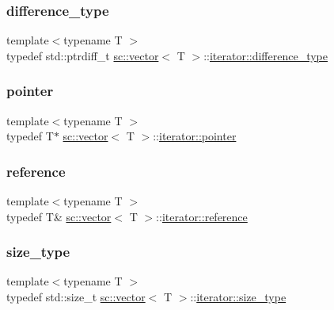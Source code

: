 \subsubsection{\texorpdfstring{difference\+\_\+type}{difference\_type}}
{\footnotesize\ttfamily template$<$typename T $>$ \\
typedef std\+::ptrdiff\+\_\+t \hyperlink{classsc_1_1vector}{sc\+::vector}$<$ T $>$\+::\hyperlink{classsc_1_1vector_1_1iterator_a7089358e9f654206713ecd3951ac3545}{iterator\+::difference\+\_\+type}}

\mbox{\label{classsc_1_1vector_1_1iterator_a518f02aadbb3fd937bdbda24120d2678}} 
\subsubsection{\texorpdfstring{pointer}{pointer}}
{\footnotesize\ttfamily template$<$typename T $>$ \\
typedef T$\ast$ \hyperlink{classsc_1_1vector}{sc\+::vector}$<$ T $>$\+::\hyperlink{classsc_1_1vector_1_1iterator_a518f02aadbb3fd937bdbda24120d2678}{iterator\+::pointer}}

\mbox{\label{classsc_1_1vector_1_1iterator_a266d58fdf67f2129ef3dc99efd652e15}} 
\subsubsection{\texorpdfstring{reference}{reference}}
{\footnotesize\ttfamily template$<$typename T $>$ \\
typedef T\& \hyperlink{classsc_1_1vector}{sc\+::vector}$<$ T $>$\+::\hyperlink{classsc_1_1vector_1_1iterator_a266d58fdf67f2129ef3dc99efd652e15}{iterator\+::reference}}

\mbox{\label{classsc_1_1vector_1_1iterator_adbbf48cc59c1a22f89c9fa6a2eb0c765}} 
\subsubsection{\texorpdfstring{size\+\_\+type}{size\_type}}
{\footnotesize\ttfamily template$<$typename T $>$ \\
typedef std\+::size\+\_\+t \hyperlink{classsc_1_1vector}{sc\+::vector}$<$ T $>$\+::\hyperlink{classsc_1_1vector_1_1iterator_adbbf48cc59c1a22f89c9fa6a2eb0c765}{iterator\+::size\+\_\+type}}



